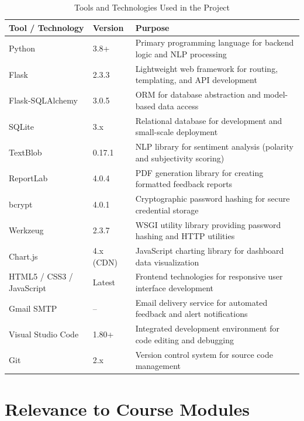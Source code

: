 \begin{table}[H]
\centering
\caption{Tools and Technologies Used in the Project}
\renewcommand{\arraystretch}{1.3}
\begin{tabularx}{\textwidth}{|p{4cm}|p{2.5cm}|X|}
\hline
\textbf{Tool / Technology} & \textbf{Version} & \textbf{Purpose} \\
\hline
Python & 3.8+ & Primary programming language for backend logic and NLP processing \\
\hline
Flask & 2.3.3 & Lightweight web framework for routing, templating, and API development \\
\hline
Flask-SQLAlchemy & 3.0.5 & ORM for database abstraction and model-based data access \\
\hline
SQLite & 3.x & Relational database for development and small-scale deployment \\
\hline
TextBlob & 0.17.1 & NLP library for sentiment analysis (polarity and subjectivity scoring) \\
\hline
ReportLab & 4.0.4 & PDF generation library for creating formatted feedback reports \\
\hline
bcrypt & 4.0.1 & Cryptographic password hashing for secure credential storage \\
\hline
Werkzeug & 2.3.7 & WSGI utility library providing password hashing and HTTP utilities \\
\hline
Chart.js & 4.x (CDN) & JavaScript charting library for dashboard data visualization \\
\hline
HTML5 / CSS3 / JavaScript & Latest & Frontend technologies for responsive user interface development \\
\hline
Gmail SMTP & -- & Email delivery service for automated feedback and alert notifications \\
\hline
Visual Studio Code & 1.80+ & Integrated development environment for code editing and debugging \\
\hline
Git & 2.x & Version control system for source code management \\
\hline
\end{tabularx}
\end{table}




\section{Relevance to Course Modules}

